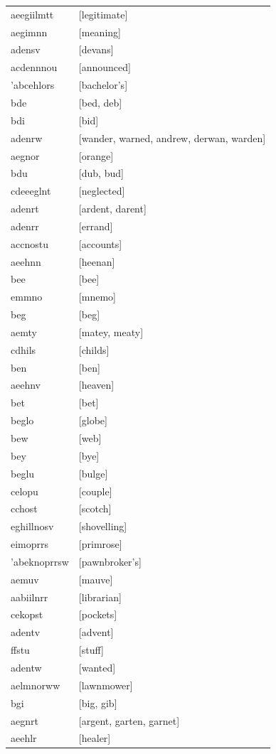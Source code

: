 \documentclass{article}
\begin{document}
\begin{tabular}{ll}
aeegiilmtt & [legitimate] \\
aegimnn & [meaning] \\
adensv & [devans] \\
acdennnou & [announced] \\
'abcehlors & [bachelor's] \\
bde & [bed, deb] \\
bdi & [bid] \\
adenrw & [wander, warned, andrew, derwan, warden] \\
aegnor & [orange] \\
bdu & [dub, bud] \\
cdeeeglnt & [neglected] \\
adenrt & [ardent, darent] \\
adenrr & [errand] \\
accnostu & [accounts] \\
aeehnn & [heenan] \\
bee & [bee] \\
emmno & [mnemo] \\
beg & [beg] \\
aemty & [matey, meaty] \\
cdhils & [childs] \\
ben & [ben] \\
aeehnv & [heaven] \\
bet & [bet] \\
beglo & [globe] \\
bew & [web] \\
bey & [bye] \\
beglu & [bulge] \\
celopu & [couple] \\
cchost & [scotch] \\
eghillnosv & [shovelling] \\
eimoprrs & [primrose] \\
'abeknoprrsw & [pawnbroker's] \\
aemuv & [mauve] \\
aabiilnrr & [librarian] \\
cekopst & [pockets] \\
adentv & [advent] \\
ffstu & [stuff] \\
adentw & [wanted] \\
aelmnorww & [lawnmower] \\
bgi & [big, gib] \\
aegnrt & [argent, garten, garnet] \\
aeehlr & [healer] \\

\end{tabular}
\end{document}
